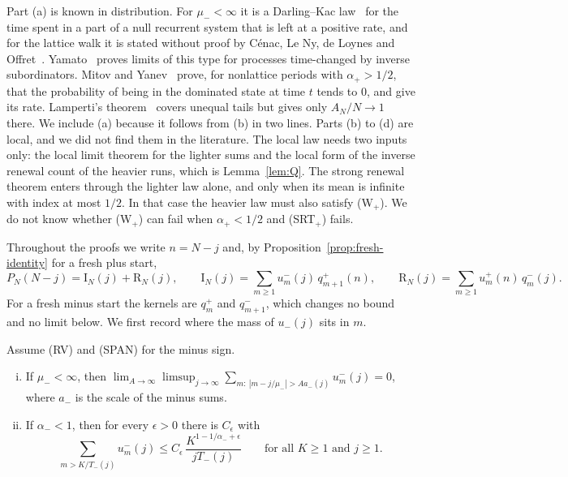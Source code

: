 Part (a) is known in distribution. For $\mu_\minus<\infty$ it is a Darling--Kac
law~\cite{darlingkac1957} for the time spent in a part of a null recurrent system that is
left at a positive rate, and for the lattice walk it is stated without proof by C\'enac, Le
Ny, de Loynes and Offret~\cite[Section~4.3]{clnlo2019}. Yamato~\cite{yamato2026} proves
limits of this type for processes time-changed by inverse subordinators. Mitov and
Yanev~\cite[Theorem~2.1]{mitovyanev2001} prove, for nonlattice periods with
$\alpha_\plus>1/2$, that the probability of being in the dominated state at time $t$ tends
to $0$, and give its rate. Lamperti's
theorem~\cite{lamperti1958} covers unequal tails but gives only $A_N/N\to1$ there. We include
(a) because it follows from (b) in two lines. Parts (b) to (d) are local, and we did not find
them in the literature. The local law needs two inputs only: the local limit theorem for the
lighter sums and the local form of the inverse renewal count of the heavier runs, which is
Lemma~\ref{lem:Q}. The strong renewal theorem enters through the lighter law alone, and only
when its mean is infinite with index at most $1/2$. In that case the heavier law must also
satisfy (W$_\plus$). We do not know whether (W$_\plus$) can fail when $\alpha_\plus<1/2$ and
(SRT$_\plus$) fails.

Throughout the proofs we write $n=N-j$ and, by Proposition~\ref{prop:fresh-identity} for a
fresh plus start,
\[
 P_N(N-j)=\mathrm I_N(j)+\mathrm R_N(j),\qquad
 \mathrm I_N(j)=\sum_{m\ge1}u^\minus_m(j)\,q^\plus_{m+1}(n),\qquad
 \mathrm R_N(j)=\sum_{m\ge1}u^\plus_m(n)\,q^\minus_m(j).
\]
For a fresh minus start the kernels are $q^\plus_m$ and $q^\minus_{m+1}$, which changes no
bound and no limit below. We first record where the mass of $u_\minus(j)$ sits in $m$.

\begin{lemma}\label{lem:R}
Assume (RV) and (SPAN) for the minus sign.
\begin{enumerate}[(i)]
\item If $\mu_\minus<\infty$, then
$\lim_{A\to\infty}\limsup_{j\to\infty}\sum_{m:\ |m-j/\mu_\minus|>Aa_\minus(j)}u^\minus_m(j)=0$, where
$a_\minus$ is the scale of the minus sums.
\item If $\alpha_\minus<1$, then for every $\epsilon>0$ there is $C_\epsilon$ with
\[
 \sum_{m>K/T_\minus(j)}u^\minus_m(j)\le C_\epsilon\,\frac{K^{1-1/\alpha_\minus+\epsilon}}{jT_\minus(j)}
 \qquad\text{for all }K\ge1\text{ and }j\ge1 .
\]
\end{enumerate}
\end{lemma}

